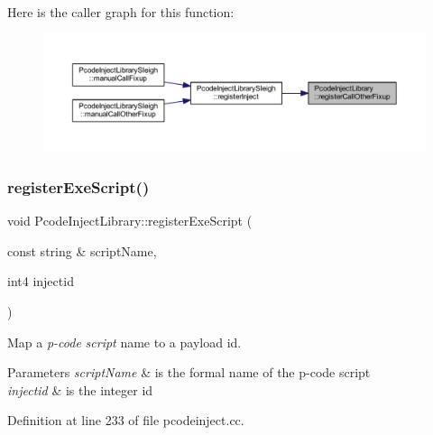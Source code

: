 Here is the caller graph for this function\+:
\nopagebreak
\begin{figure}[H]
\begin{center}
\leavevmode
\includegraphics[width=350pt]{class_pcode_inject_library_aa06eaa0357d6aeed80a3f64a5e914a53_icgraph}
\end{center}
\end{figure}
\mbox{\label{class_pcode_inject_library_a73430017e8dc38985a1e20196e59eb85}} 
\subsubsection{\texorpdfstring{registerExeScript()}{registerExeScript()}}
{\footnotesize\ttfamily void Pcode\+Inject\+Library\+::register\+Exe\+Script (\begin{DoxyParamCaption}\item[{const string \&}]{script\+Name,  }\item[{int4}]{injectid }\end{DoxyParamCaption})\hspace{0.3cm}{\ttfamily [protected]}}



Map a {\itshape p-\/code} {\itshape script} name to a payload id. 


\begin{DoxyParams}{Parameters}
{\em script\+Name} & is the formal name of the p-\/code script \\
\hline
{\em injectid} & is the integer id \\
\hline
\end{DoxyParams}


Definition at line 233 of file pcodeinject.\+cc.

